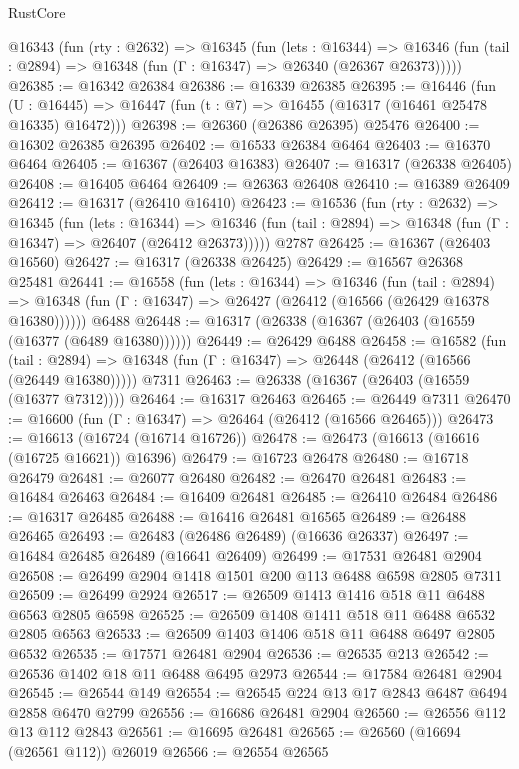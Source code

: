 \begin{lexlean}{RustCore}
\begin{coremodule}
  @16343
    (fun (rty : @2632) =>
    @16345
      (fun (lets : @16344) =>
      @16346 (fun (tail : @2894) => @16348 (fun (Γ : @16347) => @26340 (@26367 @26373)))))
@26385 := @16342 @26384
@26386 := @16339 @26385
@26395 := @16446
    (fun (U : @16445) => @16447 (fun (t : @7) => @16455 (@16317 (@16461 @25478 @16335) @16472)))
@26398 := @26360 (@26386 @26395) @25476
@26400 := @16302 @26385 @26395
@26402 := @16533 @26384 @6464
@26403 := @16370 @6464
@26405 := @16367 (@26403 @16383)
@26407 := @16317 (@26338 @26405)
@26408 := @16405 @6464
@26409 := @26363 @26408
@26410 := @16389 @26409
@26412 := @16317 (@26410 @16410)
@26423 := @16536
    (fun (rty : @2632) =>
    @16345
      (fun (lets : @16344) =>
      @16346 (fun (tail : @2894) => @16348 (fun (Γ : @16347) => @26407 (@26412 @26373)))))
    @2787
@26425 := @16367 (@26403 @16560)
@26427 := @16317 (@26338 @26425)
@26429 := @16567 @26368 @25481
@26441 := @16558
    (fun (lets : @16344) =>
    @16346
      (fun (tail : @2894) =>
      @16348 (fun (Γ : @16347) => @26427 (@26412 (@16566 (@26429 @16378 @16380))))))
    @6488
@26448 := @16317 (@26338 (@16367 (@26403 (@16559 (@16377 (@6489 @16380))))))
@26449 := @26429 @6488
@26458 := @16582
    (fun (tail : @2894) => @16348 (fun (Γ : @16347) => @26448 (@26412 (@16566 (@26449 @16380)))))
    @7311
@26463 := @26338 (@16367 (@26403 (@16559 (@16377 @7312))))
@26464 := @16317 @26463
@26465 := @26449 @7311
@26470 := @16600 (fun (Γ : @16347) => @26464 (@26412 (@16566 @26465)))
@26473 := @16613 (@16724 (@16714 @16726))
@26478 := @26473 (@16613 (@16616 (@16725 @16621)) @16396)
@26479 := @16723 @26478
@26480 := @16718 @26479
@26481 := @26077 @26480
@26482 := @26470 @26481
@26483 := @16484 @26463
@26484 := @16409 @26481
@26485 := @26410 @26484
@26486 := @16317 @26485
@26488 := @16416 @26481 @16565
@26489 := @26488 @26465
@26493 := @26483 (@26486 @26489) (@16636 @26337)
@26497 := @16484 @26485 @26489 (@16641 @26409)
@26499 := @17531 @26481 @2904
@26508 := @26499 @2904 @1418 @1501 @200 @113 @6488 @6598 @2805 @7311
@26509 := @26499 @2924
@26517 := @26509 @1413 @1416 @518 @11 @6488 @6563 @2805 @6598
@26525 := @26509 @1408 @1411 @518 @11 @6488 @6532 @2805 @6563
@26533 := @26509 @1403 @1406 @518 @11 @6488 @6497 @2805 @6532
@26535 := @17571 @26481 @2904
@26536 := @26535 @213
@26542 := @26536 @1402 @18 @11 @6488 @6495 @2973
@26544 := @17584 @26481 @2904
@26545 := @26544 @149
@26554 := @26545 @224 @13 @17 @2843 @6487 @6494 @2858 @6470 @2799
@26556 := @16686 @26481 @2904
@26560 := @26556 @112 @13 @112 @2843
@26561 := @16695 @26481
@26565 := @26560 (@16694 (@26561 @112)) @26019
@26566 := @26554 @26565

\end{coremodule}
\end{lexlean}
